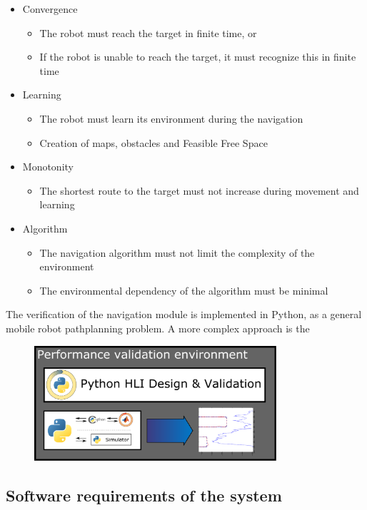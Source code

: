 \begin{itemize}
\item Convergence
\begin{itemize}
	\item The robot must reach the target in finite time, or
	\item If the robot is unable to reach the target, it must recognize this in finite time
\end{itemize}
\item Learning
\begin{itemize}
	\item The robot must learn its environment during the navigation
	\item Creation of maps, obstacles and Feasible Free Space
\end{itemize}
\item Monotonity
\begin{itemize}
	\item The shortest route to the target must not increase during movement and learning
\end{itemize}
\item Algorithm
\begin{itemize}
	\item The navigation algorithm must not limit the complexity of the environment
	\item The environmental dependency of the algorithm must be minimal
\end{itemize}

\end{itemize}

The verification of the navigation module is implemented in Python, as a general mobile robot pathplanning problem. A more complex approach is the 

\begin{figure}[H]
	\centering
	\includegraphics[width=0.8\textwidth]{img2/HLIVali}
	\caption{}
	\label{}
\end{figure}

\subsection{Software requirements of the system}

